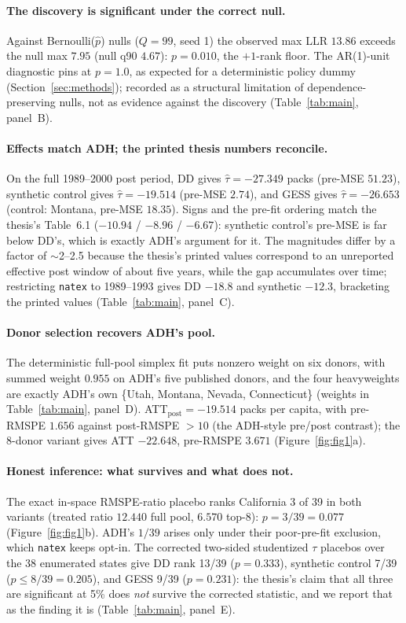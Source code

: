 \documentclass[11pt]{article}
\newcommand{\natex}{\texttt{natex}}
\begin{document}
\paragraph{The discovery is significant under the correct null.} Against
Bernoulli($\hat p$) nulls ($Q = 99$, seed 1) the observed max LLR $13.86$
exceeds the null max $7.95$ (null q90 $4.67$): $p = 0.010$, the $+1$-rank
floor. The AR(1)-unit diagnostic pins at $p = 1.0$, as expected for a
deterministic policy dummy (Section~\ref{sec:methods}); recorded as a
structural limitation of dependence-preserving nulls, not as evidence
against the discovery (Table~\ref{tab:main}, panel~B).

\paragraph{Effects match ADH; the printed thesis numbers reconcile.} On the
full 1989--2000 post period, DD gives $\hat\tau = -27.349$ packs (pre-MSE
$51.23$), synthetic control gives $\hat\tau = -19.514$ (pre-MSE $2.74$), and
GESS gives $\hat\tau = -26.653$ (control: Montana, pre-MSE $18.35$). Signs
and the pre-fit ordering match the thesis's Table~6.1 ($-10.94$ / $-8.96$ /
$-6.67$): synthetic control's pre-MSE is far below DD's, which is exactly
ADH's argument for it. The magnitudes differ by a factor of $\sim$2--2.5
because the thesis's printed values correspond to an unreported effective
post window of about five years, while the gap accumulates over time;
restricting \natex{} to 1989--1993 gives DD $-18.8$ and synthetic $-12.3$,
bracketing the printed values (Table~\ref{tab:main}, panel~C).

\paragraph{Donor selection recovers ADH's pool.} The deterministic full-pool
simplex fit puts nonzero weight on six donors, with summed weight $0.955$ on
ADH's five published donors, and the four heavyweights are exactly ADH's own
\{Utah, Montana, Nevada, Connecticut\} (weights in Table~\ref{tab:main},
panel~D). ATT$_{\text{post}} = -19.514$ packs per capita, with pre-RMSPE
$1.656$ against post-RMSPE $> 10$ (the ADH-style pre/post contrast); the
8-donor variant gives ATT $-22.648$, pre-RMSPE $3.671$
(Figure~\ref{fig:fig1}a).

\paragraph{Honest inference: what survives and what does not.} The exact
in-space RMSPE-ratio placebo ranks California 3 of 39 in both variants
(treated ratio $12.440$ full pool, $6.570$ top-8): $p = 3/39 = 0.077$
(Figure~\ref{fig:fig1}b). ADH's $1/39$ arises only under their poor-pre-fit
exclusion, which \natex{} keeps opt-in. The corrected two-sided studentized
$\tau$ placebos over the 38 enumerated states give DD rank 13/39
($p = 0.333$), synthetic control 7/39 ($p \leq 8/39 = 0.205$), and GESS 9/39
($p = 0.231$): the thesis's claim that all three are significant at 5\% does
\emph{not} survive the corrected statistic, and we report that as the finding
it is (Table~\ref{tab:main}, panel~E).
\end{document}
